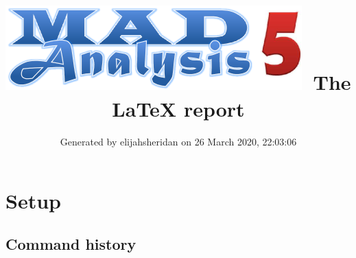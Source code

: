 \documentclass[a4paper, 10pt]{article}
\title{{\includegraphics[scale=.4]{logo.png}}\ The LaTeX report}
\author{Generated by elijahsheridan on 26 March 2020, 22:03:06}
\begin{document}
\maketitle
\flushbottom

\newpage
\section{ Setup}

\subsection{ Command history}
\end{document}
